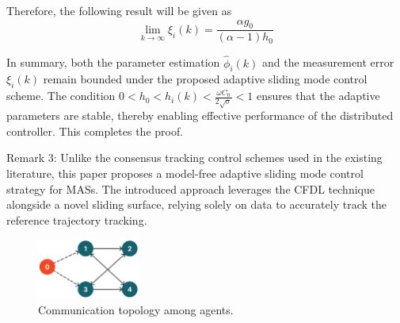 \documentclass[journal,onecolumn]{IEEEtran}
\begin{document}
Therefore, the following result will be given as
\begin{equation}
    \label{model:lim_fin}
    \lim_{k \to \infty} \xi_i(k) =  \frac{\alpha g_0}{(\alpha-1)h_0}
\end{equation}

In summary, both the parameter estimation $\hat{\phi}_i(k)$ and the measurement error $\xi_i(k)$ remain bounded under the proposed adaptive sliding mode control scheme. The condition $0 < h_0 < h_i(k) < \frac{\omega C_0}{2\sqrt{\sigma}} < 1$ ensures that the adaptive parameters are stable, thereby enabling effective performance of the distributed controller. This completes the proof.


Remark 3: Unlike the consensus tracking control schemes used in the existing literature, this paper proposes a model-free adaptive sliding mode control strategy for MASs. The introduced approach leverages the CFDL technique alongside a novel sliding surface, relying solely on data to accurately track the reference trajectory tracking. 

\begin{figure}[H]
    \centering
    \includegraphics[width=0.3\textwidth]{communication.png}
    \caption{Communication topology among agents.}
    \label{fig:communication1} %
\end{figure}




\end{document}
